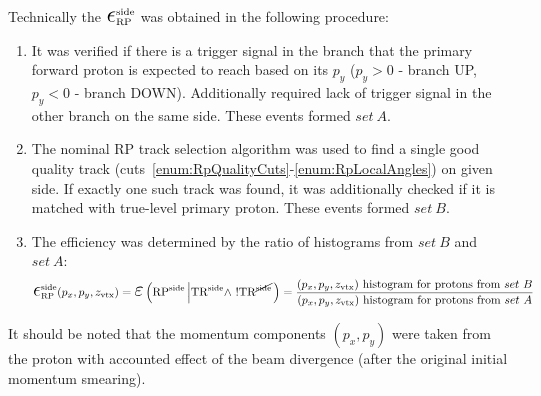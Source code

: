 Technically the $\mbox{\LARGE$\epsilon$}_{\text{RP}}^{\text{side}}$ was obtained in the following procedure:
\begin{enumerate}
	\item It was verified if there is a trigger signal in the branch that the primary forward proton is expected to reach based on its $p_{y}$ ($p_{y}>0$ - branch UP, $p_{y}<0$ - branch DOWN). Additionally required lack of trigger signal in the other branch on the same side. These events formed $set~A$.
	\item The nominal RP track selection algorithm was used to find a single good quality track (cuts~\ref{enum:RpQualityCuts}-\ref{enum:RpLocalAngles}) on given side. If exactly one such track was found, it was additionally checked if it is matched with true-level primary proton. These events formed $set~B$.
	\item The efficiency was determined by the ratio of histograms from $set~B$ and $set~A$:
	\begin{equation}\label{eq:rpEffDef}
 \mbox{\LARGE$\epsilon$}_{\text{RP}}^{\text{side}}(p_{x}, p_{y}, z_{\text{vtx}}) = \mbox{\LARGE$\varepsilon$}\left(\RPSIDE\left|\TRSIDE\land~!\TRNSIDE\right.\right) = %
 \frac{(p_{x}, p_{y}, z_{\text{vtx}})~\text{histogram for protons from}~set~B}{(p_{x}, p_{y}, z_{\text{vtx}})~\text{histogram for protons from}~set~A}
  \end{equation}
	
\end{enumerate}

It should be noted that the momentum components $(p_{x}, p_{y})$ were taken from the proton with accounted effect of the beam divergence (after the original initial momentum smearing).

